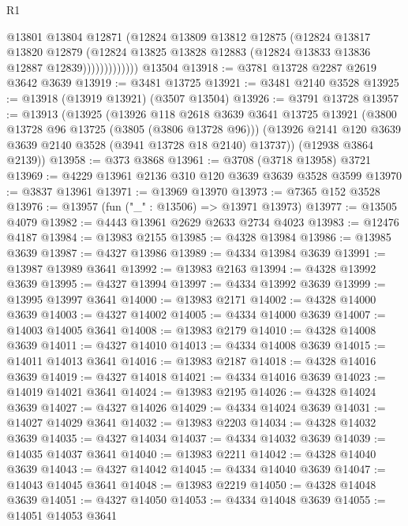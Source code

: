 \begin{lexlean}{R1}
\begin{coremodule}
                      @13801
                      @13804
                      @12871
                      (@12824
                        @13809
                        @13812
                        @12875
                        (@12824
                          @13817
                          @13820
                          @12879
                          (@12824
                            @13825
                            @13828
                            @12883
                            (@12824 @13833 @13836 @12887 @12839)))))))))))))
    @13504
@13918 := @3781 @13728 @2287 @2619 @3642 @3639
@13919 := @3481 @13725
@13921 := @3481 @2140 @3528
@13925 := @13918 (@13919 @13921) (@3507 @13504)
@13926 := @3791 @13728
@13957 := @13913
    (@13925
      (@13926
        @118
        @2618
        @3639
        @3641
        @13725
        @13921
        (@3800 @13728 @96 @13725 (@3805 (@3806 @13728 @96)))
        (@13926 @2141 @120 @3639 @3639 @2140 @3528 (@3941 @13728 @18 @2140) @13737))
      (@12938 @3864 @2139))
@13958 := @373 @3868
@13961 := @3708 (@3718 @13958) @3721
@13969 := @4229 @13961 @2136 @310 @120 @3639 @3639 @3528 @3599
@13970 := @3837 @13961
@13971 := @13969 @13970
@13973 := @7365 @152 @3528
@13976 := @13957 (fun ("_" : @13506) => @13971 @13973)
@13977 := @13505 @4079
@13982 := @4443 @13961 @2629 @2633 @2734 @4023
@13983 := @12476 @4187
@13984 := @13983 @2155
@13985 := @4328 @13984
@13986 := @13985 @3639
@13987 := @4327 @13986
@13989 := @4334 @13984 @3639
@13991 := @13987 @13989 @3641
@13992 := @13983 @2163
@13994 := @4328 @13992 @3639
@13995 := @4327 @13994
@13997 := @4334 @13992 @3639
@13999 := @13995 @13997 @3641
@14000 := @13983 @2171
@14002 := @4328 @14000 @3639
@14003 := @4327 @14002
@14005 := @4334 @14000 @3639
@14007 := @14003 @14005 @3641
@14008 := @13983 @2179
@14010 := @4328 @14008 @3639
@14011 := @4327 @14010
@14013 := @4334 @14008 @3639
@14015 := @14011 @14013 @3641
@14016 := @13983 @2187
@14018 := @4328 @14016 @3639
@14019 := @4327 @14018
@14021 := @4334 @14016 @3639
@14023 := @14019 @14021 @3641
@14024 := @13983 @2195
@14026 := @4328 @14024 @3639
@14027 := @4327 @14026
@14029 := @4334 @14024 @3639
@14031 := @14027 @14029 @3641
@14032 := @13983 @2203
@14034 := @4328 @14032 @3639
@14035 := @4327 @14034
@14037 := @4334 @14032 @3639
@14039 := @14035 @14037 @3641
@14040 := @13983 @2211
@14042 := @4328 @14040 @3639
@14043 := @4327 @14042
@14045 := @4334 @14040 @3639
@14047 := @14043 @14045 @3641
@14048 := @13983 @2219
@14050 := @4328 @14048 @3639
@14051 := @4327 @14050
@14053 := @4334 @14048 @3639
@14055 := @14051 @14053 @3641

\end{coremodule}
\end{lexlean}
